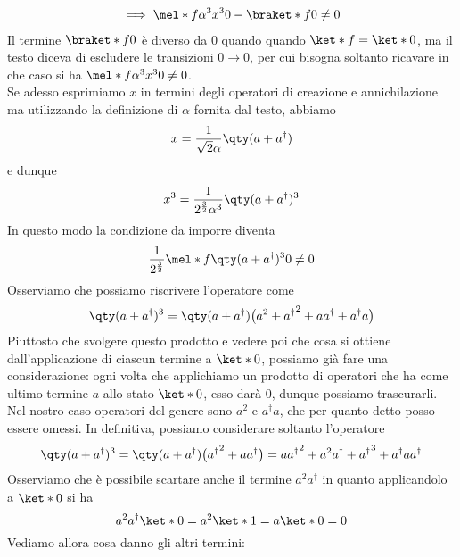 \begin{soluzione}
\begin{gather*}
      \implies
      \mel*{f}{\alpha^3 x^3}{0} - \braket*{f}{0}
      \neq 0
   \end{gather*}
   Il termine $\braket*{f}{0}$ è diverso da 0 quando quando $\ket*{f}=\ket*{0}$, ma il testo diceva di escludere le transizioni $0 \to 0$, per cui bisogna soltanto ricavare in che caso si ha $\mel*{f}{\alpha^3 x^3}{0} \neq 0$.\\
   Se adesso esprimiamo $x$ in termini degli operatori di creazione e annichilazione ma utilizzando la definizione di $\alpha$ fornita dal testo, abbiamo
   \begin{equation*}
      x=\frac{1}{\sqrt{2} \alpha} \qty( a + a^{\dag} )
   \end{equation*}
   e dunque
   \begin{equation*}
      x^3
      =\frac{1}{2^{\frac{3}{2}} \alpha^3} \qty( a + a^{\dag} )^3
   \end{equation*}
   In questo modo la condizione da imporre diventa
   \begin{equation*}
      \frac{1}{2^{\frac{3}{2}}} \mel*{f}{\qty( a + a^{\dag} )^3}{0}
      \neq 0
   \end{equation*}
   Osserviamo che possiamo riscrivere l'operatore come
   \begin{equation*}
      \qty( a + a^{\dag} )^3
      =\qty( a + a^{\dag} ) \bigl( a^2 + {a^{\dag}}^2 + aa^{\dag} + a^{\dag}a \bigr)
   \end{equation*}
   Piuttosto che svolgere questo prodotto e vedere poi che cosa si ottiene dall'applicazione di ciascun termine a $\ket*{0}$, possiamo già fare una considerazione: ogni volta che applichiamo un prodotto di operatori che ha come ultimo termine $a$ allo stato $\ket*{0}$, esso darà $0$, dunque possiamo trascurarli. Nel nostro caso operatori del genere sono $a^2$ e $a^{\dag} a$, che per quanto detto posso essere omessi. In definitiva, possiamo considerare soltanto l'operatore
   \begin{equation*}
      \qty( a + a^{\dag} )^3
      =\qty( a + a^{\dag} ) \bigl( {a^{\dag}}^2 + aa^{\dag} \bigr)
      =a{a^{\dag}}^2 + a^2 a^{\dag} + {a^{\dag}}^3 + a^{\dag} a a^{\dag}
   \end{equation*}
   Osserviamo che è possibile scartare anche il termine $a^2 a^{\dag}$ in quanto applicandolo a $\ket*{0}$ si ha
   \begin{equation*}
      a^2 a^{\dag}\ket*{0}
      =a^2 \ket*{1}
      =a \ket*{0}
      =0
   \end{equation*}
   Vediamo allora cosa danno gli altri termini:

\end{soluzione}
